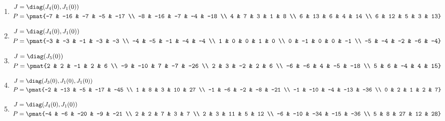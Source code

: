 \begin{enumerate}
\item

\begin{align*}
J &= \diag(J_{4}(0), J_{1}(0))\\
P &= \pmat{-7 & -16 & -7 & -5 & -17 \\ -8 & -16 & -7 & -4 & -18 \\ 4 & 7 & 3 & 1 & 8 \\ 6 & 13 & 6 & 4 & 14 \\ 6 & 12 & 5 & 3 & 13}
\end{align*}

\item

\begin{align*}
J &= \diag(J_{4}(0), J_{1}(0))\\
P &= \pmat{-3 & -3 & -1 & -3 & -3 \\ -4 & -5 & -1 & -4 & -4 \\ 1 & 0 & 0 & 1 & 0 \\ 0 & -1 & 0 & 0 & -1 \\ -5 & -4 & -2 & -6 & -4}
\end{align*}

\item

\begin{align*}
J &= \diag(J_{5}(0))\\
P &= \pmat{2 & 2 & -1 & 2 & 6 \\ -9 & -10 & 7 & -7 & -26 \\ 2 & 3 & -2 & 2 & 6 \\ -6 & -6 & 4 & -5 & -18 \\ 5 & 6 & -4 & 4 & 15}
\end{align*}

\item

\begin{align*}
J &= \diag(J_{3}(0), J_{1}(0), J_{1}(0))\\
P &= \pmat{-2 & -13 & -5 & -17 & -45 \\ 1 & 8 & 3 & 10 & 27 \\ -1 & -6 & -2 & -8 & -21 \\ -1 & -10 & -4 & -13 & -36 \\ 0 & 2 & 1 & 2 & 7}
\end{align*}

\item

\begin{align*}
J &= \diag(J_{4}(0), J_{1}(0))\\
P &= \pmat{-4 & -6 & -20 & -9 & -21 \\ 2 & 2 & 7 & 3 & 7 \\ 2 & 3 & 11 & 5 & 12 \\ -6 & -10 & -34 & -15 & -36 \\ 5 & 8 & 27 & 12 & 28}
\end{align*}


\end{enumerate}
